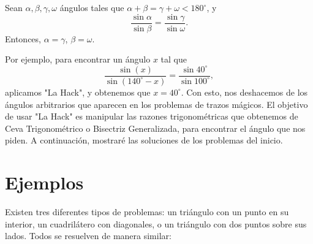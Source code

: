 \documentclass[11pt]{scrartcl}
\begin{document}
    \begin{theorem}["La Hack"]
        Sean $\alpha, \beta, \gamma, \omega$ ángulos tales que $\alpha + \beta = \gamma + \omega<180^{\circ}$, y
        \[\frac{\sin\alpha}{\sin\beta}=\frac{\sin\gamma}{\sin\omega}.\]
        Entonces, $\alpha = \gamma$, $\beta = \omega$.
    \end{theorem}

    Por ejemplo, para encontrar un ángulo $x$ tal que 
    \[\frac{\sin (x)}{\sin (140^{\circ}-x)}=\frac{\sin 40^{\circ}}{\sin 100^{\circ}},\]
    aplicamos "La Hack", y obtenemos que $x = 40^{\circ}$. Con esto, nos deshacemos de los ángulos arbitrarios que aparecen en los problemas de trazos mágicos. El objetivo de usar "La Hack" es manipular las razones trigonométricas que obtenemos de Ceva Trigonométrico o Bisectriz Generalizada, para encontrar el ángulo que nos piden. A continuación, mostraré las soluciones de los problemas del inicio.

\section{Ejemplos}

    Existen tres diferentes tipos de problemas: un triángulo con un punto en su interior, un cuadrilátero con diagonales, o un triángulo con dos puntos sobre sus lados. Todos se resuelven de manera similar:
\end{document}
